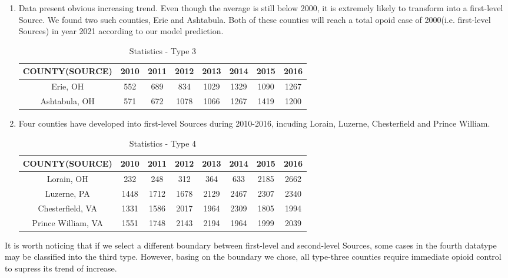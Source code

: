 \begin{enumerate}
	\item Data present obvious increasing trend. Even though the average is still below 2000, it is extremely likely to transform into a first-level Source. We found two such counties, Erie and Ashtabula. Both of these counties will reach a total opoid case of 2000(i.e. first-level Sources) in year 2021 according to our model prediction.
	\begin{table}[H]
		\centering
		\begin{tabular}{|c|c|c|c|c|c|c|c|}
			\hline
			\rowcolor[HTML]{656565} 
			{\color[HTML]{FFFFFF} \textbf{COUNTY(SOURCE)}} & {\color[HTML]{FFFFFF} \textbf{2010}} & {\color[HTML]{FFFFFF} \textbf{2011}} & {\color[HTML]{FFFFFF} \textbf{2012}} & {\color[HTML]{FFFFFF} \textbf{2013}} & {\color[HTML]{FFFFFF} \textbf{2014}} & {\color[HTML]{FFFFFF} \textbf{2015}} & {\color[HTML]{FFFFFF} \textbf{2016}}\\ \hline
			 Erie, OH &552&689&834&1029&1329&1090&1267 \\ \hline
			 Ashtabula, OH&571&672&1078&1066&1267&1419&1200 \\ \hline
		\end{tabular}
		\centering
		\caption{Statistics - Type 3}
	\end{table}

	
	\item Four counties have developed into first-level Sources during 2010-2016, incuding Lorain, Luzerne, Chesterfield and Prince William. 
\begin{table}[H]
\centering
\begin{tabular}{|c|c|c|c|c|c|c|c|}
	\hline
	\rowcolor[HTML]{656565} 
	{\color[HTML]{FFFFFF} \textbf{COUNTY(SOURCE)}} &{\color[HTML]{FFFFFF} \textbf{2010}} & {\color[HTML]{FFFFFF} \textbf{2011}} & {\color[HTML]{FFFFFF} \textbf{2012}} & {\color[HTML]{FFFFFF} \textbf{2013}} & {\color[HTML]{FFFFFF} \textbf{2014}} & {\color[HTML]{FFFFFF} \textbf{2015}} & {\color[HTML]{FFFFFF} \textbf{2016}}\\ \hline
	 Lorain, OH&232&248&312&364&633&2185&2662 \\ \hline
	 Luzerne, PA&1448&1712&1678&2129&2467&2307&2340 \\ \hline
	 Chesterfield, VA&1331&1586&2017&1964&2309&1805&1994 \\ \hline
	 Prince William, VA&1551&1748&2143&2194&1964&1999&2039 \\ \hline
\end{tabular}
\centering
\caption{Statistics - Type 4}
\end{table}
\end{enumerate}

It is worth noticing that if we select a different boundary between first-level and second-level Sources, some cases in the fourth datatype may be classified into the third type. However, basing on the boundary we chose, all type-three counties require immediate opioid control to supress its trend of increase.





